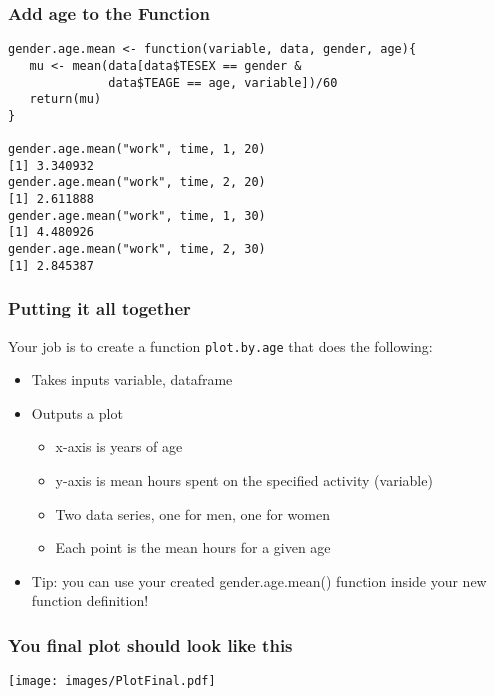 \documentclass[handout,compress]{beamer}
\begin{document}
\begin{frame}[fragile]
 \frametitle{Add age to the Function}
\begin{verbatim}
gender.age.mean <- function(variable, data, gender, age){
   mu <- mean(data[data$TESEX == gender & 
              data$TEAGE == age, variable])/60 
   return(mu)
}

gender.age.mean("work", time, 1, 20)
[1] 3.340932
gender.age.mean("work", time, 2, 20)
[1] 2.611888
gender.age.mean("work", time, 1, 30)
[1] 4.480926
gender.age.mean("work", time, 2, 30)
[1] 2.845387
\end{verbatim}
\end{frame}

\begin{frame}[fragile]
 \frametitle{Putting it all together}
 Your job is to create a function \texttt{plot.by.age} that does the following:
 \begin{itemize}
	\item Takes inputs variable, dataframe
	\item Outputs a plot
	\begin{itemize}
		\item x-axis is years of age
		\item y-axis is mean hours spent on the specified activity (variable)
		\item Two data series, one for men, one for women
		\item Each point is the mean hours for a given age
	\end{itemize}
	\item Tip: you can use your created gender.age.mean() function inside your new function definition!
\end{itemize}
\end{frame}

\begin{frame}[fragile]
 \frametitle{You final plot should look like this}
 \begin{center}
\texttt{[image: images/PlotFinal.pdf]}
\end{center}
\end{frame}
\end{document}
